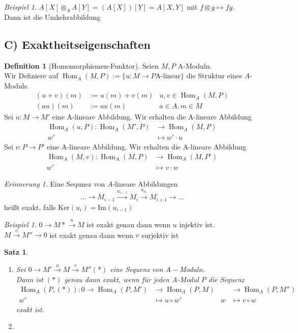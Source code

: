\documentclass[10pt,a4paper]{article}
\newcommand{\Hom}{\operatorname{Hom}}
\newcounter{thm}[section]
\theoremstyle{definition}
\newtheorem{definition}[thm]{Definition}
\theoremstyle{plain}
\newtheorem{satz}[thm]{Satz}
\theoremstyle{remark}
\newtheorem{rem}[thm]{Erinnerung}
\newtheorem{exm}[thm]{Beispiel}
\begin{document}
\begin{exm}
	$A[X]\otimes_A A[Y]=(A[X])[Y]=A[X,Y]$ mit $f\otimes g\mapsto fg$.\\
	Dann ist die Umkehrabbildung
\end{exm}
\subsection*{C) Exaktheitseigenschaften}
\begin{definition}[Homomorphismen-Funktor]
	Seien $M,P$ A-Moduln.\\
	Wir Definiere auf $\Hom_A(M,P):=\{u:M\rightarrow P \text{A-linear}\}$ die Struktur eines $A$-Moduls.
	\begin{align*}
	(u+v)(m)&:=u(m)+v(m) &u,v\in\Hom_A(M,P)\\
	(au)(m)&:=au(m)		 &a\in A,m\in M
	\end{align*}
	Sei $u:M\rightarrow M'$ eine A-lineare Abbildung. Wir erhalten die A-lineare Abbildung
	\begin{align*}
	\Hom_A(u,P):\Hom_A(M',P)&\rightarrow \Hom_A(M,P)\\
	w'&\mapsto w'\cdot u
	\end{align*}
	Sei $v:P\rightarrow P'$ eine A-lineare Abbildung. Wir erhalten die A-lineare Abbildung
	\begin{align*}
	\Hom_A(M,v):\Hom_A(M,P)&\rightarrow \Hom_A(M,P')\\
	w'&\mapsto v\cdot w
	\end{align*}
\end{definition}
\begin{rem}
	Eine Sequnez von $A$-lineare Abbildungen\[...\rightarrow M_{i-1}\xrightarrow{u_{i-1}}M_i\xrightarrow{u_{u_i}}M_{i+1}\rightarrow ...\]
	heißt exakt, falls $\text{Ker}(u_i)=\text{Im}(u_{i-1})$
\end{rem}
\begin{exm}
	$0\rightarrow M*\xrightarrow{u}M$ ist exakt genau dann wenn $u$ injektiv ist.\\
	$M\xrightarrow{v}M''\rightarrow 0$ ist exakt genau dann wenn $v$ surjektiv ist
\end{exm}
\begin{satz}
	\begin{enumerate}
		\item Sei $0\rightarrow M'\xrightarrow{u}M\xrightarrow{v}M''(*)$ eine Sequenz von $A-$Moduln.\\
		Dann ist $(*)$ genau dann exakt, wenn für jeden A-Modul $P$ die Sequenz
		\begin{align*}
		\Hom_A(P,(*)):0\rightarrow \Hom_A(P,M')&\rightarrow \Hom_A(P,M)&&\rightarrow \Hom_A(P,M'')\\
		w'&\mapsto u\circ w'&w&\mapsto v\circ w
		\end{align*}
		exakt ist.
		\item %
	\end{enumerate}
\end{satz}
\end{document}
